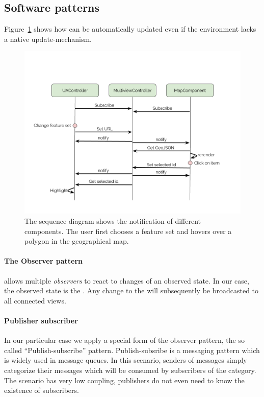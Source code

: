 \subsection{Software patterns}
Figure~\ref{fig:implementation:sequence-diagram} shows how \cmvs{} can be automatically updated even if the environment lacks a native update-mechanism.

\begin{figure}[h!]
  \centering
  \includegraphics[width=\textwidth]{images/sequence-diagram.png}
  \caption{%
    The sequence diagram shows the notification of different components.
  The user first chooses a feature set and hovers over a polygon in the geographical map.
  }\label{fig:implementation:sequence-diagram}
\end{figure}


\paragraph{The Observer pattern} allows multiple \emph{observers} to react to changes of an observed state.
In our case, the observed state is the .
Any change to the  will subsequently be broadcasted to all connected views.


\paragraph{Publisher subscriber}
In our particular case we apply a special form of the observer pattern, the so called ``Publish-subscribe'' pattern\cite{Eugster2003}.
Publish-subsribe is a messaging pattern which is widely used in message queues.
In this scenario, senders of messages simply categorize their messages which will be consumed by subscribers of the category.
The scenario has very low coupling, publishers do not even need to know the existence of subscribers.

